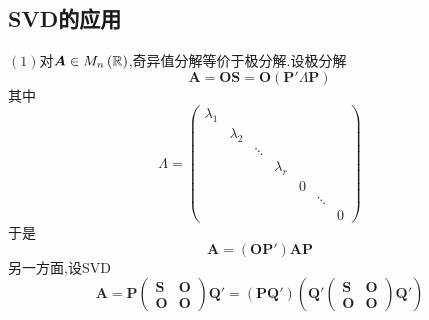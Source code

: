 \subsection{SVD的应用}
$(1)$对$\bm{A}\in M_n\left(\mathbb{R} \right)$,奇异值分解等价于极分解.设极分解\[
    \bm{A}=\bm{OS}=\bm{O}\left(
    \bm{P}'\bm{\varLambda}\bm{P}
    \right)
\]其中\[
    \bm{\varLambda}=\begin{pmatrix}
        \lambda_1 &           &        &           &   &        &   \\
                  & \lambda_2 &        &           &   &        &   \\
                  &           & \ddots &           &   &        &   \\
                  &           &        & \lambda_r &   &        &   \\
                  &           &        &           & 0 &        &   \\
                  &           &        &           &   & \ddots &   \\
                  &           &        &           &   &        & 0
    \end{pmatrix}
\]于是\[
    \bm{A}=\left(
    \bm{OP}'
    \right)\bm{AP}
\]
另一方面,设SVD\[
    \bm{A}=\bm{P}\begin{pmatrix}
        \bm{S} & \bm{O} \\
        \bm{O} & \bm{O}
    \end{pmatrix}\bm{Q}'=\left(
    \bm{PQ}'
    \right)\left(
    \bm{Q}'\begin{pmatrix}
        \bm{S} & \bm{O} \\
        \bm{O} & \bm{O}
    \end{pmatrix}\bm{Q}'
    \right)
\]

